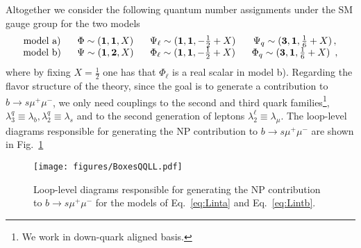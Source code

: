\documentclass[a4paper,11pt]{article}
\begin{document}
 Altogether we consider the following quantum number assignments under the SM gauge group for the two models
\begin{equation}
\begin{array}{cccc}
\text{model a)}~~& \Phi\sim ({\bf 1},{\bf 1},X)~~& \Psi_\ell \sim ({\bf 1},{\bf 1},-\frac{1}{2}+X)~~&\Psi_q \sim ({\bf 3},{\bf 1},\frac{1}{6}+X)\,, \\
\text{model b)}~~&\Psi\sim ({\bf 1},{\bf 2},X)~~&\Phi_\ell \sim ({\bf 1},{\bf 1},-\frac{1}{2}+X)~~&\Phi_q \sim ({\bf 3},{\bf 1},\frac{1}{6}+X) \, \ ,
\end{array}
\end{equation}
where by fixing $X=\frac{1}{2}$ one has that $\Phi_\ell$ is a real scalar in model b).
Regarding the flavor structure of the theory, since the goal is to generate a contribution to $b\to s \mu^+ \mu^-$, we only need couplings to the second and third quark families\footnote{We work in down-quark aligned basis.}, $\lambda^q_3\equiv\lambda_b,\lambda^q_2\equiv\lambda_s$ and to the second generation of leptons $\lambda^\ell_2\equiv\lambda_\mu$. 
The loop-level diagrams responsible for generating the NP contribution to $b\to s\mu^+\mu^-$ are shown in Fig.~\ref{fig:pheno_box} 

\begin{figure}[t!]
\begin{center}
\texttt{[image: figures/BoxesQQLL.pdf]}  
\caption{\small Loop-level diagrams responsible for generating the NP contribution to $b\to s\mu^+\mu^-$ for the models of Eq.~\eqref{eq:Linta} and Eq.~\eqref{eq:Lintb}.}
\label{fig:pheno_box}
\end{center}
\end{figure}
\end{document}
